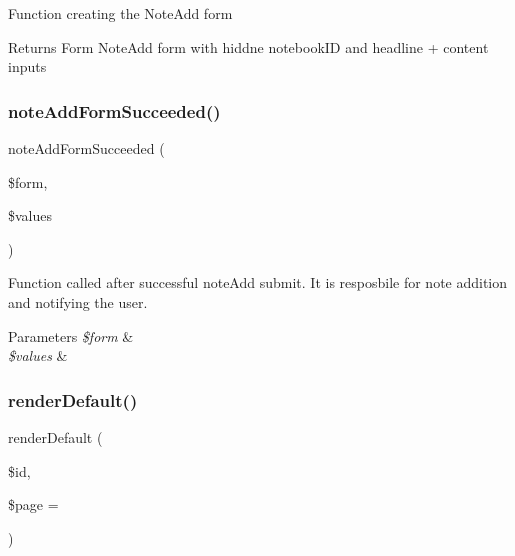 Function creating the Note\+Add form

\begin{DoxyReturn}{Returns}
Form Note\+Add form with hiddne notebook\+ID and headline + content inputs 
\end{DoxyReturn}
\mbox{\label{class_app_1_1_presenters_1_1_notebook_presenter_af4e4ada78cf634f26140f658dc710c06}} 
\subsubsection{\texorpdfstring{note\+Add\+Form\+Succeeded()}{noteAddFormSucceeded()}}
{\footnotesize\ttfamily note\+Add\+Form\+Succeeded (\begin{DoxyParamCaption}\item[{}]{\$form,  }\item[{}]{\$values }\end{DoxyParamCaption})}

Function called after successful note\+Add submit. It is resposbile for note addition and notifying the user.


\begin{DoxyParams}{Parameters}
{\em \$form} & \\
\hline
{\em \$values} & \\
\hline
\end{DoxyParams}
\mbox{\label{class_app_1_1_presenters_1_1_notebook_presenter_a0abea8519a466f30d4fe2a7b9e2872f8}} 
\subsubsection{\texorpdfstring{render\+Default()}{renderDefault()}}
{\footnotesize\ttfamily render\+Default (\begin{DoxyParamCaption}\item[{}]{\$id,  }\item[{}]{\$page = {} }\end{DoxyParamCaption})}


